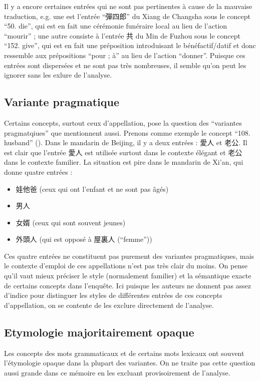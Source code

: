 \documentclass{scrbook}
\newcounter{c}[subsubsection]
\begin{document}
\begin{sloppypar}
Il y a encore certaines entrées qui ne sont pas pertinentes à cause de la mauvaise traduction, e.g. une est l'entrée ``彈四郎'' du Xiang de Changsha sous le concept ``50. die'', qui est en fait une cérémonie funéraire local au lieu de l'action ``mourir'' ; une autre consiste à l'entrée 共 du Min de Fuzhou sous le concept ``152. give'', qui est en fait une préposition introduisant le bénéfactif/datif et donc ressemble aux prépositions ``pour ; à'' au lieu de l'action ``donner''. Puisque ces entrées sont dispersées et ne sont pas très nombreuses, il semble qu'on peut les ignorer sans les exlure de l'analyse.

\subsection{Variante pragmatique} 
Certains concepts, surtout ceux d'appellation, pose la question des ``variantes pragmatqiues'' que \textcite[13]{wu2023annotating} mentionnent aussi. Prenons comme exemple le concept ``108. husband'' (\cite[124]{Liu2007hexinci}). Dans le mandarin de Beijing, il y a deux entrées : 愛人 et 老公. Il est clair que l'entrée 愛人 est utilisée surtout dans le contexte élégant et 老公 dans le contexte familier. La situation est pire dans le mandarin de Xi'an, qui donne quatre entrées : 

\begin{itemize}
\item{娃他爸 (ceux qui ont l'enfant et ne sont pas âgés)}

\item{男人}

\item{女婿 (ceux qui sont souvent jeunes)}

\item{外頭人 (qui est opposé à 屋裏人 (``femme''))}
\end{itemize}

Ces quatre entrées ne constituent pas purement des variantes pragmatiques, mais le contexte d'emploi de ces appellations n'est pas très clair du moins. On pense qu'il vaut mieux préciser le style (normalement familier) et la sémantique exacte de certains concepts dans l'enquête. Ici puisque les auteurs ne donnent pas assez d'indice pour distinguer les styles de différentes entrées de ces concepts d'appellation, on se contente de les exclure directement de l'analyse.

\subsection{Etymologie majoritairement opaque}
Les concepts des mots grammaticaux et de certains mots lexicaux ont souvent l'étymologie opaque dans la plupart des variantes.  On ne traite pas cette question aussi grande dans ce mémoire en les excluant provisoirement de l'analyse. 


\end{sloppypar}
\end{document}
